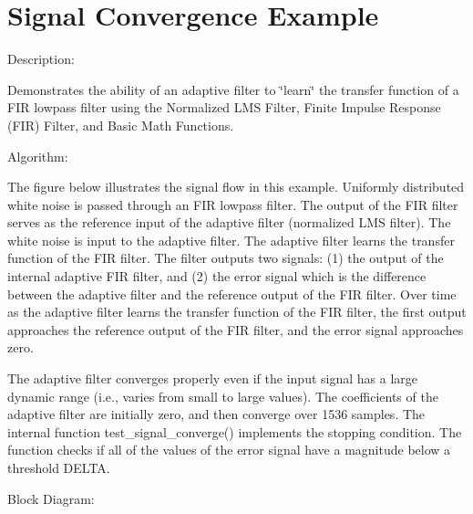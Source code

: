 \hypertarget{group___signal_convergence}{\section{Signal Convergence Example}
\label{group___signal_convergence}
}
\begin{DoxyParagraph}{Description\-: }

\end{DoxyParagraph}
\begin{DoxyParagraph}{}
Demonstrates the ability of an adaptive filter to \char`\"{}learn\char`\"{} the transfer function of a F\-I\-R lowpass filter using the Normalized L\-M\-S Filter, Finite Impulse Response (F\-I\-R) Filter, and Basic Math Functions.
\end{DoxyParagraph}
\begin{DoxyParagraph}{Algorithm\-:}

\end{DoxyParagraph}
\begin{DoxyParagraph}{}
The figure below illustrates the signal flow in this example. Uniformly distributed white noise is passed through an F\-I\-R lowpass filter. The output of the F\-I\-R filter serves as the reference input of the adaptive filter (normalized L\-M\-S filter). The white noise is input to the adaptive filter. The adaptive filter learns the transfer function of the F\-I\-R filter. The filter outputs two signals\-: (1) the output of the internal adaptive F\-I\-R filter, and (2) the error signal which is the difference between the adaptive filter and the reference output of the F\-I\-R filter. Over time as the adaptive filter learns the transfer function of the F\-I\-R filter, the first output approaches the reference output of the F\-I\-R filter, and the error signal approaches zero. 
\end{DoxyParagraph}
\begin{DoxyParagraph}{}
The adaptive filter converges properly even if the input signal has a large dynamic range (i.\-e., varies from small to large values). The coefficients of the adaptive filter are initially zero, and then converge over 1536 samples. The internal function test\-\_\-signal\-\_\-converge() implements the stopping condition. The function checks if all of the values of the error signal have a magnitude below a threshold D\-E\-L\-T\-A.
\end{DoxyParagraph}
\begin{DoxyParagraph}{Block Diagram\-:}

\end{DoxyParagraph}
